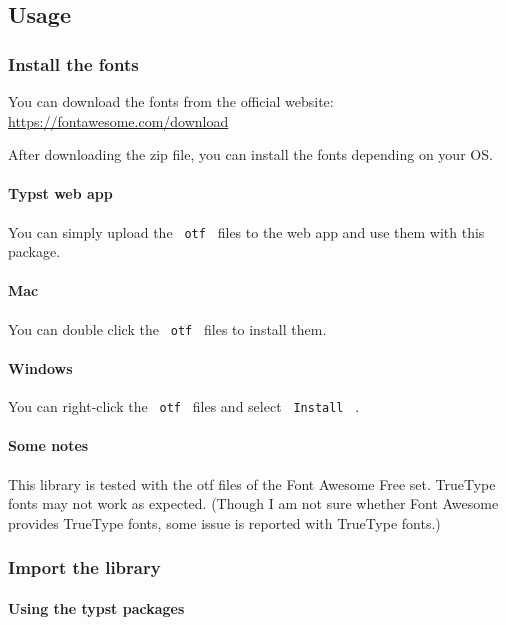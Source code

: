 \subsection{Usage}\label{usage}

\subsubsection{Install the fonts}\label{install-the-fonts}

You can download the fonts from the official website:
\url{https://fontawesome.com/download}

After downloading the zip file, you can install the fonts depending on
your OS.

\paragraph{Typst web app}\label{typst-web-app}

You can simply upload the \texttt{\ otf\ } files to the web app and use
them with this package.

\paragraph{Mac}\label{mac}

You can double click the \texttt{\ otf\ } files to install them.

\paragraph{Windows}\label{windows}

You can right-click the \texttt{\ otf\ } files and select
\texttt{\ Install\ } .

\paragraph{Some notes}\label{some-notes}

This library is tested with the otf files of the Font Awesome Free set.
TrueType fonts may not work as expected. (Though I am not sure whether
Font Awesome provides TrueType fonts, some issue is reported with
TrueType fonts.)

\subsubsection{Import the library}\label{import-the-library}

\paragraph{Using the typst packages}\label{using-the-typst-packages}

